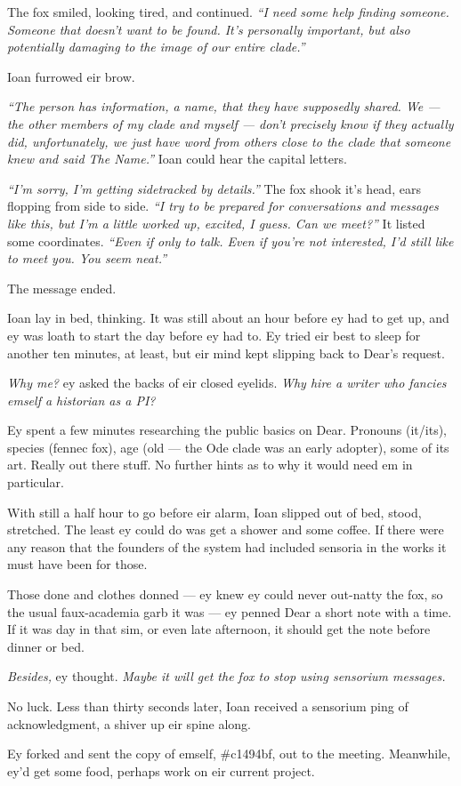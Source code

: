The fox smiled, looking tired, and continued. \emph{``I need some help finding someone. Someone that doesn't want to be found. It's personally important, but also potentially damaging to the image of our entire clade.''}

Ioan furrowed eir brow.

\emph{``The person has information, a name, that they have supposedly shared. We --- the other members of my clade and myself --- don't precisely know if they actually did, unfortunately, we just have word from others close to the clade that someone knew and said The Name.''} Ioan could hear the capital letters.

\emph{``I'm sorry, I'm getting sidetracked by details.''} The fox shook it's head, ears flopping from side to side. \emph{``I try to be prepared for conversations and messages like this, but I'm a little worked up, excited, I guess. Can we meet?''} It listed some coordinates. \emph{``Even if only to talk. Even if you're not interested, I'd still like to meet you. You seem neat.''}

The message ended.

Ioan lay in bed, thinking. It was still about an hour before ey had to get up, and ey was loath to start the day before ey had to. Ey tried eir best to sleep for another ten minutes, at least, but eir mind kept slipping back to Dear's request.

\emph{Why me?} ey asked the backs of eir closed eyelids. \emph{Why hire a writer who fancies emself a historian as a PI?}

Ey spent a few minutes researching the public basics on Dear. Pronouns (it/its), species (fennec fox), age (old --- the Ode clade was an early adopter), some of its art. Really out there stuff. No further hints as to why it would need em in particular.

With still a half hour to go before eir alarm, Ioan slipped out of bed, stood, stretched. The least ey could do was get a shower and some coffee. If there were any reason that the founders of the system had included sensoria in the works it must have been for those.

Those done and clothes donned --- ey knew ey could never out-natty the fox, so the usual faux-academia garb it was --- ey penned Dear a short note with a time. If it was day in that sim, or even late afternoon, it should get the note before dinner or bed.

\emph{Besides,} ey thought. \emph{Maybe it will get the fox to stop using sensorium messages.}

No luck. Less than thirty seconds later, Ioan received a sensorium ping of acknowledgment, a shiver up eir spine along.

Ey forked and sent the copy of emself, \#c1494bf, out to the meeting. Meanwhile, ey'd get some food, perhaps work on eir current project.
